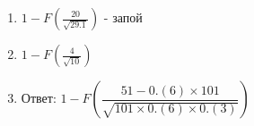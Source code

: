 \documentclass[11pt, a4paper]{article}
\theoremstyle{definition}
\begin{document}
\begin{enumerate}
\begin{enumerate}
        \item $1 - F(\frac{20}{\sqrt{29.1}})$ - запой
        
        \item $1 - F(\frac{4}{\sqrt{10}})$
        
        \item Ответ: $1 - F\left(\dfrac{51-0.(6)\times 101}{\sqrt{101\times0.(6)\times 0.(3)}}\right)$
        
    \end{enumerate}



\end{enumerate}
\end{document}
